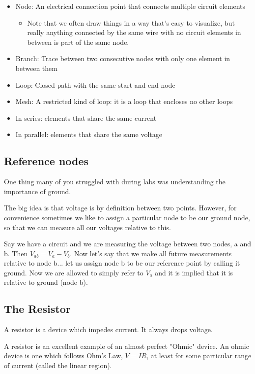 \documentclass{article}
\begin{document}
\begin{itemize}
  \item Node: An electrical connection point that connects multiple circuit elements
    \begin{itemize}
      \item Note that we often draw things in a way that's easy to visualize, but really anything connected by the same wire with no circuit elements in between is part of the same node.
    \end{itemize}
  \item Branch: Trace between two consecutive nodes with only one element in between them
  \item Loop: Closed path with the same start and end node
  \item Mesh: A restricted kind of loop: it is a loop that encloses no other loops
  \item In series: elements that share the same current
  \item In parallel: elements that share the same voltage
\end{itemize}

\subsection{Reference nodes}
One thing many of you struggled with during labs was understanding the importance of ground.

The big idea is that voltage is by definition between two points. However, for convenience sometimes we like to assign a particular node to be our ground node, so that we can measure all our voltages relative to this.

Say we have a circuit and we are measuring the voltage between two nodes, a and
b. Then $V_{ab} = V_a - V_b$. Now let's say that we make all future measurements
relative to node b... let us assign node b to be our reference point by calling
it ground. Now we are allowed to simply refer to $V_a$ and it is implied that it is relative to ground (node b).

\subsection{The Resistor}
A resistor is a device which impedes current. It always drops voltage.

A resistor is an excellent example of an almost perfect "Ohmic" device. An ohmic
device is one which follows Ohm's Law, $V = IR$, at least for some particular range of current (called the linear region).
\end{document}
